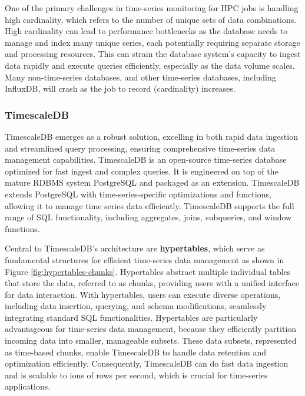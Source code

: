 One of the primary challenges in time-series monitoring for HPC jobs is handling high cardinality, which refers to the number of unique sets of data combinations. High cardinality can lead to performance bottlenecks as the database needs to manage and index many unique series, each potentially requiring separate storage and processing resources. This can strain the database system's capacity to ingest data rapidly and execute queries efficiently, especially as the data volume scales. Many non-time-series databases, and other time-series databases, including InfluxDB, will crash as the job to record (cardinality) increases.

\subsubsection{TimescaleDB}

TimescaleDB \cite{timescaledb} emerges as a robust solution, excelling in both rapid data ingestion and streamlined query processing, ensuring comprehensive time-series data management capabilities. TimescaleDB is an open-source time-series database optimized for fast ingest and complex queries. It is engineered on top of the mature RDBMS system PostgreSQL and packaged as an extension. TimescaleDB extends PostgreSQL with time-series-specific optimizations and functions, allowing it to manage time series data efficiently. TimescaleDB supports the full range of SQL functionality, including aggregates, joins, subqueries, and window functions.

Central to TimescaleDB's architecture are \textbf{hypertables}, which serve as fundamental structures for efficient time-series data management as shown in Figure \ref{fig:hypertables-chunks}. Hypertables abstract multiple individual tables that store the data, referred to as chunks, providing users with a unified interface for data interaction. With hypertables, users can execute diverse operations, including data insertion, querying, and schema modifications, seamlessly integrating standard SQL functionalities. Hypertables are particularly advantageous for time-series data management, because they efficiently partition incoming data into smaller, manageable subsets. These data subsets, represented as time-based chunks, enable TimescaleDB to handle data retention and optimization efficiently. Consequently, TimescaleDB can do fast data ingestion and is scalable to ions of rows per second, which is crucial for time-series applications.

